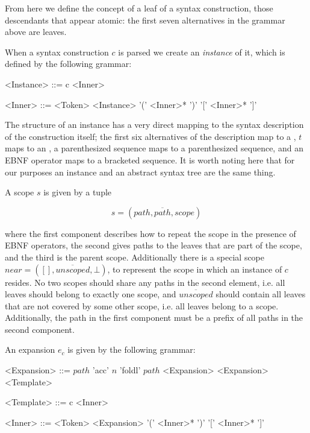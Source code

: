 \documentclass{kththesis}
\begin{document}
From here we define the concept of a leaf of a syntax construction, those descendants that appear atomic: the first seven alternatives in the grammar above are leaves.

When a syntax construction $c$ is parsed we create an \emph{instance} of it, which is defined by the following grammar:

\setlength{\grammarindent}{6.5em}
\begin{grammar}
<Instance> ::= c <Inner>

<Inner> ::= <Token>
  \alt <Instance>
  \alt '(' <Inner>* ')'
  \alt '[' <Inner>* ']'
\end{grammar}

The structure of an instance has a very direct mapping to the syntax description of the construction itself; the first six alternatives of the description map to a , $t$ maps to an , a parenthesized sequence maps to a parenthesized sequence, and an EBNF operator maps to a bracketed sequence. It is worth noting here that for our purposes an instance and an abstract syntax tree are the same thing.

A scope $s$ is given by a tuple

$$ s = (path, \overline{path}, scope) $$

where the first component describes how to repeat the scope in the presence of EBNF operators, the second gives paths to the leaves that are part of the scope, and the third is the parent scope. Additionally there is a special scope $near = ([], \overline{unscoped}, \bot)$, to represent the scope in which an instance of $c$ resides. No two scopes should share any paths in the second element, i.e. all leaves should belong to exactly one scope, and $\overline{unscoped}$ should contain all leaves that are not covered by some other scope, i.e. all leaves belong to a scope. Additionally, the path in the first component must be a prefix of all paths in the second component.

An expansion $e_c$ is given by the following grammar:

\setlength{\grammarindent}{8em}
\begin{grammar}
<Expansion> ::= $path$
  \alt 'acc' $n$
  \alt 'foldl' $path$ <Expansion> <Expansion>
  \alt <Template>

<Template> ::= c <Inner>

<Inner> ::= <Token>
  \alt <Expansion>
  \alt '(' <Inner>* ')'
  \alt '[' <Inner>* ']'
\end{grammar}
\end{document}
